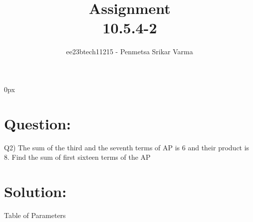 \documentclass[beamer]{IEEEtran}
\theoremstyle{remark}
\begin{document}
\parindent 0px


\title{Assignment\\[1ex]10.5.4-2}
\author{ee23btech11215 - Penmetsa Srikar Varma$^{}$%
}
\maketitle
\newpage
\bigskip

\renewcommand{\thefigure}{\theenumi}
\renewcommand{\thetable}{\theenumi}
\section*{Question:}
Q2) The sum of the third and the seventh terms of AP is 6 and their product is 8. Find the sum of first sixteen terms of the AP\\
\section*{Solution:}
{
\centering
Table of Parameters\\
}
\begin{table}[h]
    \centering
    
    \label{tab:my_label}
\end{table}
\end{document}
